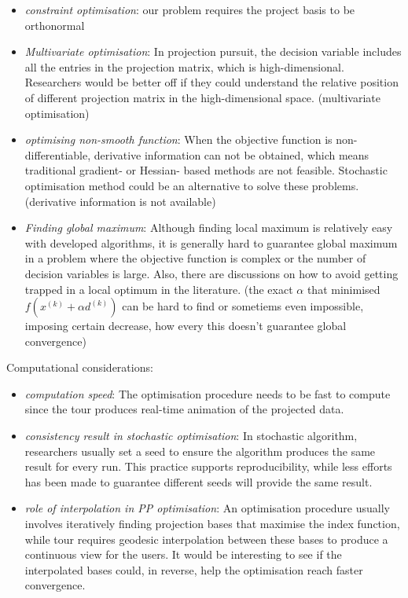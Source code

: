 \documentclass[12pt]{article}
\begin{document}
\begin{itemize}
\item
  \emph{constraint optimisation}: our problem requires the project basis
  to be orthonormal
\item
  \emph{Multivariate optimisation}: In projection pursuit, the decision
  variable includes all the entries in the projection matrix, which is
  high-dimensional. Researchers would be better off if they could
  understand the relative position of different projection matrix in the
  high-dimensional space. (multivariate optimisation)
\item
  \emph{optimising non-smooth function}: When the objective function is
  non-differentiable, derivative information can not be obtained, which
  means traditional gradient- or Hessian- based methods are not
  feasible. Stochastic optimisation method could be an alternative to
  solve these problems. (derivative information is not available)
\item
  \emph{Finding global maximum}: Although finding local maximum is
  relatively easy with developed algorithms, it is generally hard to
  guarantee global maximum in a problem where the objective function is
  complex or the number of decision variables is large. Also, there are
  discussions on how to avoid getting trapped in a local optimum in the
  literature. (the exact \(\alpha\) that minimised
  \(f(x^{(k)}+ \alpha d^{(k)})\) can be hard to find or sometiems even
  impossible, imposing certain decrease, how every this doesn't
  guarantee global convergence)
\end{itemize}

Computational considerations:

\begin{itemize}
\item
  \emph{computation speed}: The optimisation procedure needs to be fast
  to compute since the tour produces real-time animation of the
  projected data.
\item
  \emph{consistency result in stochastic optimisation}: In stochastic
  algorithm, researchers usually set a seed to ensure the algorithm
  produces the same result for every run. This practice supports
  reproducibility, while less efforts has been made to guarantee
  different seeds will provide the same result.
\item
  \emph{role of interpolation in PP optimisation}: An optimisation
  procedure usually involves iteratively finding projection bases that
  maximise the index function, while tour requires geodesic
  interpolation between these bases to produce a continuous view for the
  users. It would be interesting to see if the interpolated bases could,
  in reverse, help the optimisation reach faster convergence.
\end{itemize}
\end{document}
